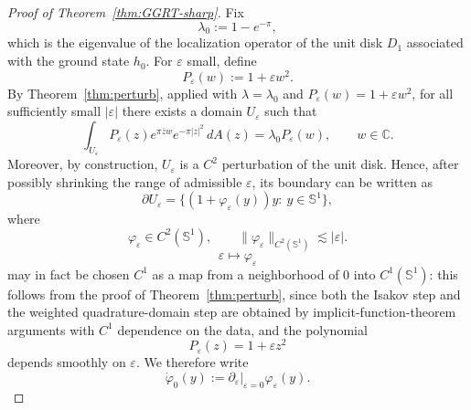 \documentclass[a4paper,11pt,reqno]{amsart}
\numberwithin{equation}{section}
\theoremstyle{plain} %
\theoremstyle{definition} %
\theoremstyle{remark}
\newcommand{\C}{\mathbb{C}}
\begin{document}
\begin{proof}[Proof of Theorem~\ref{thm:GGRT-sharp}]
Fix
\[
\lambda_0:=1-e^{-\pi},
\]
which is the eigenvalue of the localization operator of the unit disk $D_1$
associated with the ground state $h_0$. For $\varepsilon$ small, define
\[
P_\varepsilon(w):=1+\varepsilon w^2.
\]
By Theorem~\ref{thm:perturb}, applied with \(\lambda=\lambda_0\) and
\(P_\varepsilon(w)=1+\varepsilon w^2\), for all sufficiently small
\(|\varepsilon|\) there exists a domain \(U_\varepsilon\) such that
\begin{equation}\label{eq:functiona-P-eps-new}
\int_{U_\varepsilon} P_\varepsilon(z)e^{\pi \overline zw}e^{-\pi|z|^2}\,dA(z)
=
\lambda_0 P_\varepsilon(w),
\qquad w\in\C.
\end{equation}
Moreover, by construction, $U_\varepsilon$ is a $C^2$ perturbation of the unit
disk. Hence, after possibly shrinking the range of admissible $\varepsilon$,
its boundary can be written as
\begin{equation}\label{eq:def-u-eps-new}
\partial U_\varepsilon
=
\{(1+\varphi_\varepsilon(y))y:\ y\in \mathbb S^1\},
\end{equation}
where
\[
\varphi_\varepsilon\in C^2(\mathbb S^1),
\qquad
\|\varphi_\varepsilon\|_{C^2(\mathbb S^1)}\lesssim |\varepsilon|.
\]
\[
\varepsilon\mapsto \varphi_\varepsilon
\]
may in fact be chosen \(C^1\) as a map from a neighborhood of \(0\) into
\(C^1(\mathbb S^1)\): this follows from the proof of
Theorem~\ref{thm:perturb}, since both the Isakov step and the weighted
quadrature-domain step are obtained by implicit-function-theorem arguments with
\(C^1\) dependence on the data, and the polynomial
\[
P_\varepsilon(z)=1+\varepsilon z^2
\]
depends smoothly on \(\varepsilon\). We therefore write
\[
\dot\varphi_0(y):=
\left.\partial_\varepsilon\right|_{\varepsilon=0}\varphi_\varepsilon(y).
\]


\end{proof}
\end{document}
